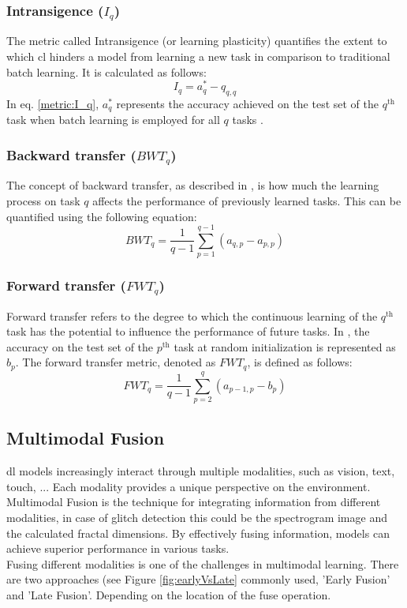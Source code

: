 \subsubsection{Intransigence ($I_{q}$)}
The metric called Intransigence (or learning plasticity) quantifies the extent to which \acrshort{cl} hinders a model from learning a new task in comparison to traditional batch learning. It is calculated as follows: 
\begin{equation}
\label{metric:I_q}
    I_{q} = a^{*}_{q} - q_{q,q}
\end{equation} 
In eq. \ref{metric:I_q}, $a^{*}_{q}$ represents the accuracy achieved on the test set of the $q^{\text{th}}$ task when batch learning is employed for all $q$ tasks \citep{chaudhry2018riemannian}.

\subsubsection{Backward transfer ($BWT_{q}$)}
The concept of backward transfer, as described in \citep{lopez2017gradient}, is how much the learning process on task $q$ affects the performance of previously learned tasks. This can be quantified using the following equation: \begin{equation}
\label{metric:BWT_q}
BWT_{q} = \frac{1}{q-1} \sum_{p=1}^{q-1} (a_{q,p} - a_{p,p})
\end{equation}

\subsubsection{Forward transfer ($FWT_{q}$)}
Forward transfer refers to the degree to which the continuous learning of the $q^{\text{th}}$ task has the potential to influence the performance of future tasks. In \citep{lopez2017gradient}, the accuracy on the test set of the $p^{\text{th}}$ task at random initialization is represented as $b_{p}$. The forward transfer metric, denoted as $FWT_{q}$, is defined as follows: \begin{equation} FWT_{q} = \frac{1}{q-1} \sum_{p=2}^{q} (a_{p-1,p} - b_{p}) \end{equation}
\citep{wang2023comprehensive}

\subsection{Multimodal Fusion}
\acrshort{dl} models increasingly interact through multiple modalities, such as vision, text, touch, ... Each modality provides a unique perspective on the environment. Multimodal Fusion is the technique for integrating information from different modalities, in case of glitch detection this could be the spectrogram image and the calculated fractal dimensions. By effectively fusing information, models can achieve superior performance in various tasks. \\
\citep{ngiam2011multimodal, gao2020survey, zhang2021exploring}
Fusing different modalities is one of the challenges in multimodal learning. There are two approaches (see Figure \ref{fig:earlyVsLate} commonly used, 'Early Fusion' and 'Late Fusion'. Depending on the location of the fuse operation. 

